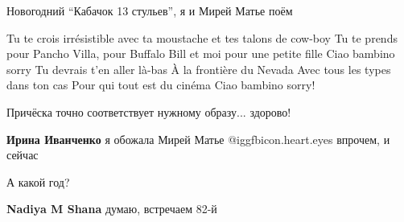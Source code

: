  
 
 
 
 


Новогодний \enquote{Кабачок 13 стульев}, я и Мирей Матье поём

\obeycr
Tu te crois irrésistible avec ta moustache et tes talons de cow-boy
Tu te prends pour Pancho Villa, pour Buffalo Bill et moi pour une petite fille
Ciao bambino sorry
Tu devrais t'en aller là-bas
À la frontière du Nevada
Avec tous les types dans ton cas
Pour qui tout est du cinéma
Ciao bambino sorry! 
\restorecr

Причёска точно соответствует нужному образу... здорово!

\textbf{Ирина Иванченко} я обожала Мирей Матье  @igg{fbicon.heart.eyes}  впрочем, и сейчас

А какой год?

\textbf{Nadiya M Shana} думаю, встречаем 82-й
